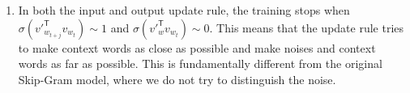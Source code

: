 \documentclass[
	12pt, %
]{../Template/fphw}
\newcommand{\T}{\mathsf{T}}
\begin{document}
\begin{enumerate}[label=(\arabic*)]
    \item In both the input and output update rule, the training stops when $\sigma(v'^\T_{w_{t+j}} v_{w_t}) \sim 1$ and $\sigma(v'^\T_{w} v_{w_t}) \sim 0$. This means that the update rule tries to make context words as close as possible and make noises and context words as far as possible. This is fundamentally different from the original Skip-Gram model, where we do not try to distinguish the noise.
    
\end{enumerate}

\end{document}
